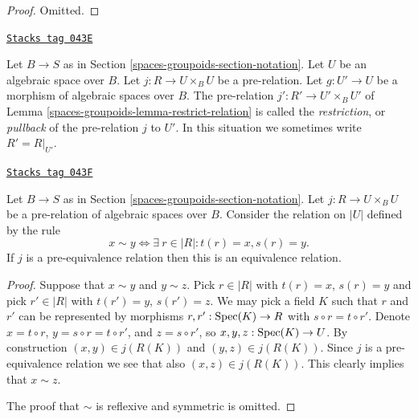 \begin{proof}
Omitted.
\end{proof}

\begin{definition}
\label{spaces-groupoids-definition-restrict-relation}
\href{https://stacks.math.columbia.edu/tag/043E}{\texttt{Stacks tag 043E}}

Let $B \to S$ as in Section \ref{spaces-groupoids-section-notation}.
Let $U$ be an algebraic space over $B$.
Let $j : R \to U \times_B U$ be a pre-relation.
Let $g : U' \to U$ be a morphism of algebraic spaces over $B$.
The pre-relation $j' : R' \to U' \times_B U'$ of
Lemma \ref{spaces-groupoids-lemma-restrict-relation} is called
the {\it restriction}, or {\it pullback} of the pre-relation $j$ to $U'$.
In this situation we sometimes write $R' = R|_{U'}$.
\end{definition}

\begin{lemma}
\label{spaces-groupoids-lemma-pre-equivalence-equivalence-relation-points}
\href{https://stacks.math.columbia.edu/tag/043F}{\texttt{Stacks tag 043F}}

Let $B \to S$ as in Section \ref{spaces-groupoids-section-notation}.
Let $j : R \to U \times_B U$ be a pre-relation of algebraic spaces over $B$.
Consider the relation on $|U|$ defined by the rule
$$
x \sim y
\Leftrightarrow
\exists\ r \in |R| :
t(r) = x,
s(r) = y.
$$
If $j$ is a pre-equivalence relation then this is an equivalence relation.
\end{lemma}

\begin{proof}
Suppose that $x \sim y$ and $y \sim z$.
Pick $r \in |R|$ with $t(r) = x$, $s(r) = y$ and
pick $r' \in |R|$ with $t(r') = y$, $s(r') = z$.
We may pick a field $K$ such that $r$ and $r'$ can be
represented by morphisms $r, r' : \operatorname{Spec}(K) \to R$
with $s \circ r = t \circ r'$.
Denote $x = t \circ r$, $y = s \circ r = t \circ r'$,
and $z = s \circ r'$, so $x, y, z : \operatorname{Spec}(K) \to U$.
By construction $(x, y) \in j(R(K))$ and
$(y, z) \in j(R(K))$. Since $j$ is a pre-equivalence relation
we see that also $(x, z) \in j(R(K))$.
This clearly implies that $x \sim z$.

\medskip\noindent
The proof that $\sim$ is reflexive and symmetric is omitted.
\end{proof}

